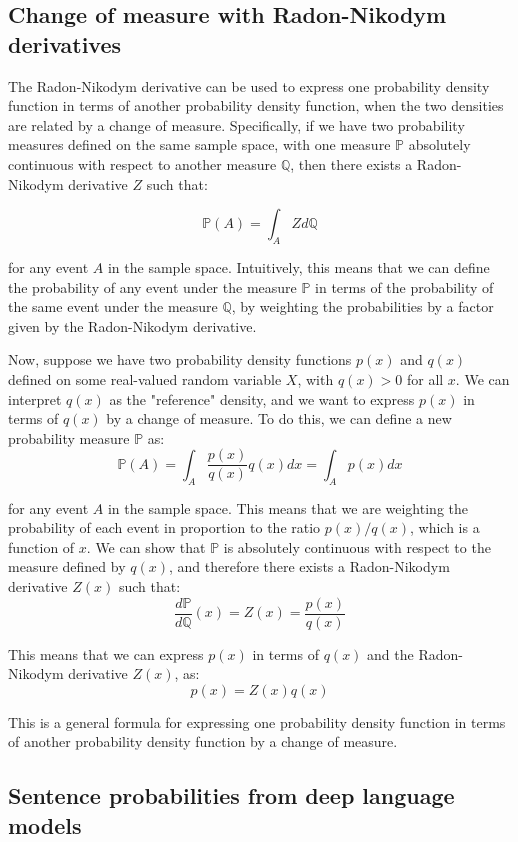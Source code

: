 \documentclass{article}
\begin{document}
\subsection{Change of measure with Radon-Nikodym derivatives}
\label{sec:change_of_measure}

The Radon-Nikodym derivative can be used to express one probability density function in terms of another probability density function, when the two densities are related by a change of measure. Specifically, if we have two probability measures defined on the same sample space, with one measure $\mathbb{P}$ absolutely continuous with respect to another measure $\mathbb{Q}$, then there exists a Radon-Nikodym derivative $Z$ such that:

$$\mathbb{P}(A) = \int_A Z d\mathbb{Q}$$

for any event $A$ in the sample space. Intuitively, this means that we can define the probability of any event under the measure $\mathbb{P}$ in terms of the probability of the same event under the measure $\mathbb{Q}$, by weighting the probabilities by a factor given by the Radon-Nikodym derivative.

Now, suppose we have two probability density functions $p(x)$ and $q(x)$ defined on some real-valued random variable $X$, with $q(x)>0$ for all $x$. We can interpret $q(x)$ as the "reference" density, and we want to express $p(x)$ in terms of $q(x)$ by a change of measure. To do this, we can define a new probability measure $\mathbb{P}$ as:
$$\mathbb{P}(A) = \int_A \frac{p(x)}{q(x)} q(x) dx = \int_A p(x) dx$$

for any event $A$ in the sample space. This means that we are weighting the probability of each event in proportion to the ratio $p(x)/q(x)$, which is a function of $x$. We can show that $\mathbb{P}$ is absolutely continuous with respect to the measure defined by $q(x)$, and therefore there exists a Radon-Nikodym derivative $Z(x)$ such that:
$$\frac{d\mathbb{P}}{d\mathbb{Q}}(x) = Z(x) = \frac{p(x)}{q(x)}$$

This means that we can express $p(x)$ in terms of $q(x)$ and the Radon-Nikodym derivative $Z(x)$, as:
$$p(x) = Z(x) q(x)$$

This is a general formula for expressing one probability density function in terms of another probability density function by a change of measure.

\subsection{Sentence probabilities from deep language models}
\label{sec:huggingface_sentence_probs}
\end{document}
